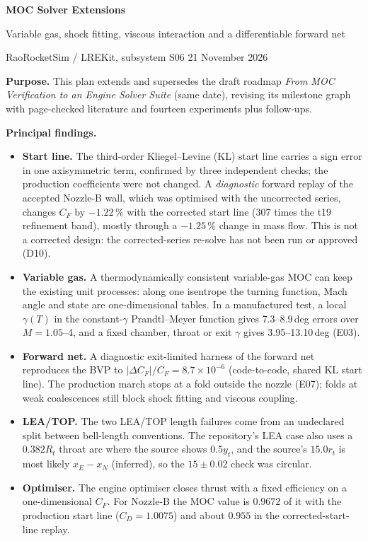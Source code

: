 \documentclass[11pt,letterpaper]{article}
\begin{document}
\thispagestyle{empty}
{\huge\sffamily\bfseries\color{ink}MOC Solver Extensions\par}
\vspace{0.15cm}
{\large\sffamily\color{teal}Variable gas, shock fitting, viscous interaction and a differentiable forward net\par}
\vspace{0.15cm}
{\small RaoRocketSim / LREKit, subsystem S06 \hfill 21 November 2026\par}
\vspace{0.25cm}
\textbf{Purpose.} This plan extends and supersedes the draft roadmap
\emph{From MOC Verification to an Engine Solver Suite} (same date), revising its
milestone graph with page-checked literature and fourteen experiments plus follow-ups.

\textbf{Principal findings.}
\begin{itemize}
\item \textbf{Start line.} The third-order Kliegel--Levine (KL) start line carries a
sign error in one axisymmetric term, confirmed by three independent checks; the
production coefficients were not changed. A \emph{diagnostic} forward replay of the
accepted Nozzle-B wall, which was optimised with the uncorrected series, changes $C_F$
by $-1.22$\,\% with the corrected start line (307 times the t19 refinement band),
mostly through a $-1.25$\,\% change in mass flow. This is not a corrected design: the
corrected-series re-solve has not been run or approved (D10).
\item \textbf{Variable gas.} A thermodynamically consistent variable-gas MOC can keep
the existing unit processes: along one isentrope the turning function, Mach angle
and state are one-dimensional tables. In a manufactured test, a local $\gamma(T)$
in the constant-$\gamma$ Prandtl--Meyer function gives 7.3--8.9\,deg errors over
$M=1.05$--4, and a fixed chamber, throat or exit $\gamma$ gives 3.95--13.10\,deg (E03).
\item \textbf{Forward net.} A diagnostic exit-limited harness of the forward net
reproduces the BVP to $|\Delta C_F|/C_F=8.7\times10^{-6}$ (code-to-code, shared KL
start line). The production march stops at a fold outside the nozzle (E07); folds at
weak coalescences still block shock fitting and viscous coupling.
\item \textbf{LEA/TOP.} The two LEA/TOP length failures come from an undeclared split
between bell-length conventions. The repository's LEA case also uses a $0.382R_t$
throat arc where the source shows $0.5y_t$, and the source's $15.0r_t$ is most likely
$x_E-x_N$ (inferred), so the $15\pm0.02$ check was circular.
\item \textbf{Optimiser.} The engine optimiser closes thrust with a fixed efficiency on a
one-dimensional $C_F$. For Nozzle-B the MOC value is $0.9672$ of it with the production
start line ($C_D=1.0075$) and about $0.955$ in the corrected-start-line replay.
\end{itemize}
\end{document}
